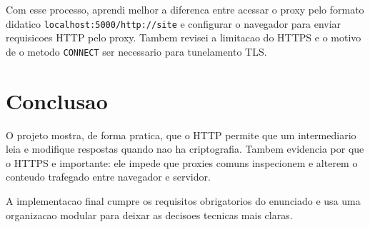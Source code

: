 \documentclass[12pt,a4paper]{article}
\begin{document}
Com esse processo, aprendi melhor a diferenca entre acessar o proxy pelo formato didatico \texttt{localhost:5000/http://site} e configurar o navegador para enviar requisicoes HTTP pelo proxy. Tambem revisei a limitacao do HTTPS e o motivo de o metodo \texttt{CONNECT} ser necessario para tunelamento TLS.

\section{Conclusao}

O projeto mostra, de forma pratica, que o HTTP permite que um intermediario leia e modifique respostas quando nao ha criptografia. Tambem evidencia por que o HTTPS e importante: ele impede que proxies comuns inspecionem e alterem o conteudo trafegado entre navegador e servidor.

A implementacao final cumpre os requisitos obrigatorios do enunciado e usa uma organizacao modular para deixar as decisoes tecnicas mais claras.
\end{document}
